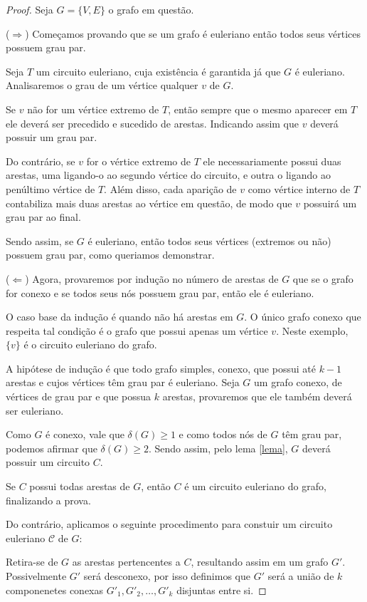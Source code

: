 \documentclass[12pt, a4paper]{article}
\begin{document}
\begin{proof}

Seja $G = \{V, E\}$ o grafo em questão.

($\Rightarrow$) Começamos provando que se um grafo é euleriano então todos seus vértices possuem grau par.

Seja $T$ um circuito euleriano, cuja existência é garantida já que $G$ é euleriano. Analisaremos o grau de um vértice qualquer $v$ de $G$.

Se $v$ não for um vértice extremo de $T$, então sempre que o mesmo aparecer em $T$ ele deverá ser precedido e sucedido de arestas. Indicando assim que $v$ deverá possuir um grau par.

Do contrário, se $v$ for o vértice extremo de $T$ ele necessariamente possui duas arestas, uma ligando-o ao segundo vértice do circuito, e outra o ligando ao penúltimo vértice de $T$. 
Além disso, cada aparição de $v$ como vértice interno de $T$ contabiliza mais duas arestas ao vértice em questão, de modo que $v$ possuirá um grau par ao final.

Sendo assim, se $G$ é euleriano, então todos seus vértices (extremos ou não) possuem grau par, como queriamos demonstrar.\newline

($\Leftarrow$) Agora, provaremos por indução no número de arestas de $G$ que se o grafo for conexo e se todos seus nós possuem grau par, então ele é euleriano.

O caso base da indução é quando não há arestas em $G$. 
O único grafo conexo que respeita tal condição é o grafo que possui apenas um vértice $v$.
Neste exemplo, $\{v\}$ é o circuito euleriano do grafo.

A hipótese de indução é que todo grafo simples, conexo, que possui até $k-1$ arestas e cujos vértices têm grau par é euleriano. 
Seja $G$ um grafo conexo, de vértices de grau par e que possua $k$ arestas, provaremos que ele também deverá ser euleriano.

Como $G$ é conexo, vale que $\delta(G) \geq 1$ e como todos nós de $G$ têm grau par, podemos afirmar que $\delta(G) \geq 2$. 
Sendo assim, pelo lema \ref{lema}, $G$ deverá possuir um circuito $C$.

Se $C$ possui todas arestas de $G$, então $C$ é um circuito euleriano do grafo, finalizando a prova.

Do contrário, aplicamos o seguinte procedimento para constuir um circuito euleriano $\mathcal{C}$ de $G$:

Retira-se de $G$ as arestas pertencentes a $C$, resultando assim em um grafo $G'$. 
Possivelmente $G'$ será desconexo, por isso definimos que $G'$ será a união de $k$ componenetes conexas $G'_1, G'_2, \dots, G'_k$ disjuntas entre si.


\end{proof}
\end{document}
